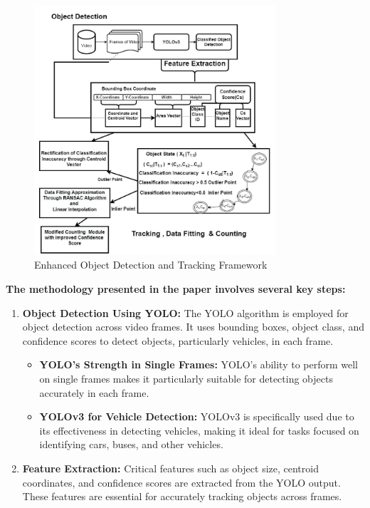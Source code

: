 {\begin{figure}[h!]
    \includegraphics[width=0.8\textwidth]{images/Paper 4 Architecture.png}
    \caption{Enhanced Object Detection and Tracking Framework}
\end{figure}
%
%
\newpage
\noindent
\textbf{The methodology presented in the paper involves several key steps:}
\begin{enumerate}
  \item \textbf{Object Detection Using YOLO:} The YOLO algorithm is employed for object detection across video frames. It uses bounding boxes, object class, and confidence scores to detect objects, particularly vehicles, in each frame.
  \begin{itemize}
    \item \textbf{YOLO's Strength in Single Frames:} YOLO's ability to perform well on single frames makes it particularly suitable for detecting objects accurately in each frame.
    \item \textbf{YOLOv3 for Vehicle Detection:} YOLOv3 is specifically used due to its effectiveness in detecting vehicles, making it ideal for tasks focused on identifying cars, buses, and other vehicles.
  \end{itemize}
  \item \textbf{Feature Extraction:} Critical features such as object size, centroid coordinates, and confidence scores are extracted from the YOLO output. These features are essential for accurately tracking objects across frames.

\end{enumerate}}
